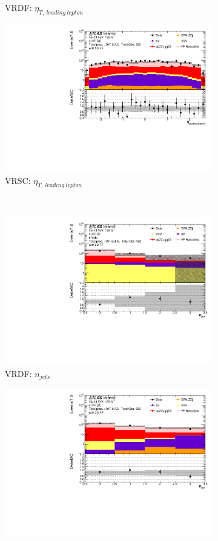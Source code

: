\begin{figure}[htb]
\begin{subfigure}{.48\textwidth}
        \caption{VRDF: $\eta_{T,~leading~lepton}$}
    \end{subfigure}
    \begin{subfigure}{.48\textwidth}
        \centering
        \includegraphics[width = 0.85\linewidth]{figures/Analysis/Background/Overlay_VRSC_FFApplied_eta1.pdf}
        \caption{VRSC: $\eta_{T,~leading~lepton}$}
    \end{subfigure}\\
    \begin{subfigure}{.48\textwidth}
        \centering
        \includegraphics[width = 0.85\linewidth]{figures/Analysis/Background/Overlay_VRDF_FFApplied_n_jets.pdf}
        \caption{VRDF: $n_{jets}$}
    \end{subfigure}
    \begin{subfigure}{.48\textwidth}
        \centering
        \includegraphics[width = 0.85\linewidth]{figures/Analysis/Background/Overlay_VRSC_FFApplied_n_jets.pdf}

\end{subfigure}
\end{figure}
